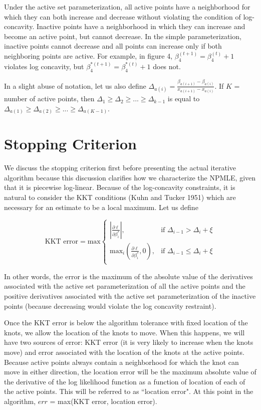 \documentclass[10pt]{article}
\begin{document}
	Under the active set parameterization, all active points have a neighborhood for which they can both increase and decrease without violating the condition of log-concavity. Inactive points have a neighborhood in which they can increase and become an active point, but cannot decrease. In the simple parameterization, inactive points cannot decrease and all points can increase only if both neighboring points are active. For example, in figure 4, $\beta_4^{(t + 1)} = \beta_4^{(t)} + 1$ violates log concavity, but $\beta_4^{*(t+1)} = \beta_4^{*(t)} + 1$ does not. 
	
	In a slight abuse of notation, let us also define $\Delta_{a(i)} = \frac{\beta_{a(i + 1)} - \beta_{a(i)} } {x_{a(i + 1)} - x_{a(i)} }$. If $K$ = number of active points, then $\Delta_1 \geq \Delta_2 \geq ... \geq \Delta_{k-1}$ is equal to  $\Delta_{a(1)} \geq \Delta_{a(2)} \geq ... \geq \Delta_{a(K-1)}$. 

			
	{\section{Stopping Criterion} } 
	We discuss the stopping criterion first before presenting the actual iterative algorithm because this discussion clarifies how we characterize the NPMLE, given that it is piecewise log-linear.  Because of the log-concavity constraints, it is natural to consider the KKT conditions (Kuhn and Tucker 1951) which are necessary for an estimate to be a local maximum. Let us define
	
	\[
	\text{KKT error} = {\text{max}} 
	\begin{cases}
		|\frac{\partial \ell } {\partial \beta_i^*}|, & \text{if } \Delta_{i-1} > \Delta_{i} + \xi \\
		\text{max}_i(\frac{\partial \ell}{\partial \beta_i^*},0 ) , & \text{if } \Delta_{i-1} \leq \Delta_i + \xi \\  
	\end{cases}
	\]
	
	In other words, the error is the maximum of the absolute value of the derivatives associated with the active set parameterization of all the active points and the positive derivatives associated with the active set parameterization of the inactive points (because decreasing would violate the log concavity restraint). 
	
	Once the KKT error is below the algorithm tolerance with fixed location of the knots, we allow the location of the knots to move. When this happens, we will have two sources of error: KKT error (it is very likely to increase when the knots move) and error associated with the location of the knots at the active points. Because active points always contain a neighborhood for which the knot can move in either direction, the location error will be the maximum absolute value of the derivative of the log likelihood function as a function of location of each of the active points. This will be referred to as ``location error". At this point in the algorithm, $err$ = max(KKT error, location error). 
	
\end{document}
